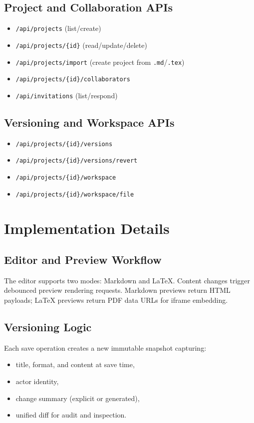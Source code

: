 \documentclass[11pt,a4paper]{article}
\begin{document}
\subsection{Project and Collaboration APIs}
\begin{itemize}[leftmargin=1.5em]
  \item \texttt{/api/projects} (list/create)
  \item \texttt{/api/projects/\{id\}} (read/update/delete)
  \item \texttt{/api/projects/import} (create project from \texttt{.md}/\texttt{.tex})
  \item \texttt{/api/projects/\{id\}/collaborators}
  \item \texttt{/api/invitations} (list/respond)
\end{itemize}

\subsection{Versioning and Workspace APIs}
\begin{itemize}[leftmargin=1.5em]
  \item \texttt{/api/projects/\{id\}/versions}
  \item \texttt{/api/projects/\{id\}/versions/revert}
  \item \texttt{/api/projects/\{id\}/workspace}
  \item \texttt{/api/projects/\{id\}/workspace/file}
\end{itemize}

\section{Implementation Details}
\subsection{Editor and Preview Workflow}
The editor supports two modes: Markdown and LaTeX. Content changes trigger debounced preview rendering requests. Markdown previews return HTML payloads; LaTeX previews return PDF data URLs for iframe embedding.

\subsection{Versioning Logic}
Each save operation creates a new immutable snapshot capturing:
\begin{itemize}[leftmargin=1.5em]
  \item title, format, and content at save time,
  \item actor identity,
  \item change summary (explicit or generated),
  \item unified diff for audit and inspection.
\end{itemize}
\end{document}
